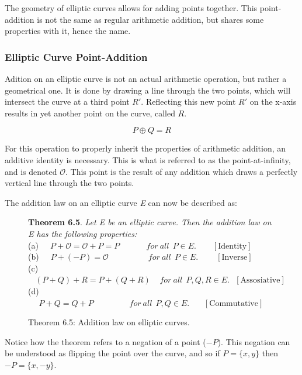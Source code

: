 The geometry of elliptic curves allows for adding points together. This point-addition is not the same as regular arithmetic addition, but shares some properties with it, hence the name. 
\subsubsection{Elliptic Curve Point-Addition}
\label{ECPA}
Adition on an elliptic curve is not an actual arithmetic operation, but rather a geometrical one. It is done by drawing a line through the two points, which will intersect the curve at a third point $R'$. Reflecting this new point $R'$ on the x-axis results in yet another point on the curve, called $R$.

$$P \oplus Q = R$$

For this operation to properly inherit the properties of arithmetic addition, an additive identity is necessary. This is what is referred to as the point-at-infinity, and is denoted $\mathcal{O}$. This point is the result of any addition which draws a perfectly vertical line through the two points\cite{IntroToMath}. 

The addition law on an elliptic curve \textit{E} can now be described as:\\
\begin{figure}[H]

\textbf{Theorem 6.5}. \textit{Let E be an elliptic curve. Then the addition law on E has the following properties:}\\
(a) $~~~~~ P + \mathcal{O} = \mathcal{O} + P = P ~~~~~~~~~~~~~~~ for ~ all ~~ P \in E. ~~~~~~~~~ [\text{Identity}]$ \\
(b) $~~~~~ P + (-P) = \mathcal{O} ~~~~~~~~~~~~~~~~~~~~~~ for ~ all ~~ P \in E. ~~~~~~~~~~ [\text{Inverse}]$ \\
(c) $~~~~ (P+Q) + R = P+(Q+R) ~~~~~ for ~ all ~~ P,Q,R \in E. ~~~ [\text{Assosiative}]$ \\
(d) $~~~~~~ P + Q = Q+P ~~~~~~~~~~~~~~~~~~~~ for ~ all ~~ P,Q \in E. ~~~~~~~~ [\text{Commutative}]$ 
\caption{Theorem 6.5: Addition law on elliptic curves\cite{IntroToMath}.}
\end{figure}


Notice how the theorem refers to a negation of a point ($-P$). This negation can be understood as flipping the point over the curve, and so if $P=\{x,y\}$ then $-P=\{x,-y\}$.


